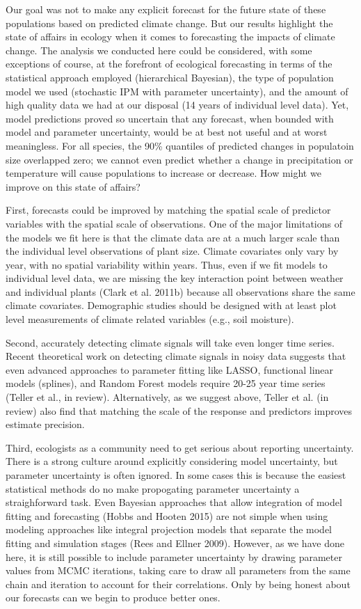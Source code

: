 \documentclass[12pt,]{article}
\begin{document}
Our goal was not to make any explicit forecast for the future state of
these populations based on predicted climate change. But our results
highlight the state of affairs in ecology when it comes to forecasting
the impacts of climate change. The analysis we conducted here could be
considered, with some exceptions of course, at the forefront of
ecological forecasting in terms of the statistical approach employed
(hierarchical Bayesian), the type of population model we used
(stochastic IPM with parameter uncertainty), and the amount of high
quality data we had at our disposal (14 years of individual level data).
Yet, model predictions proved so uncertain that any forecast, when
bounded with model and parameter uncertainty, would be at best not
useful and at worst meaningless. For all species, the 90\% quantiles of
predicted changes in populatoin size overlapped zero; we cannot even
predict whether a change in precipitation or temperature will cause
populations to increase or decrease. How might we improve on this state
of affairs?

First, forecasts could be improved by matching the spatial scale of
predictor variables with the spatial scale of observations. One of the
major limitations of the models we fit here is that the climate data are
at a much larger scale than the individual level observations of plant
size. Climate covariates only vary by year, with no spatial variability
within years. Thus, even if we fit models to individual level data, we
are missing the key interaction point between weather and individual
plants (Clark et al. 2011b) because all observations share the same
climate covariates. Demographic studies should be designed with at least
plot level measurements of climate related variables (e.g., soil
moisture).

Second, accurately detecting climate signals will take even longer time
series. Recent theoretical work on detecting climate signals in noisy
data suggests that even advanced approaches to parameter fitting like
LASSO, functional linear models (splines), and Random Forest models
require 20-25 year time series (Teller et al., in review).
Alternatively, as we suggest above, Teller et al. (in review) also find
that matching the scale of the response and predictors improves estimate
precision.

Third, ecologists as a community need to get serious about reporting
uncertainty. There is a strong culture around explicitly considering
model uncertainty, but parameter uncertainty is often ignored. In some
cases this is because the easiest statistical methods do no make
propogating parameter uncertainty a straighforward task. Even Bayesian
approaches that allow integration of model fitting and forecasting
(Hobbs and Hooten 2015) are not simple when using modeling approaches
like integral projection models that separate the model fitting and
simulation stages (Rees and Ellner 2009). However, as we have done here,
it is still possible to include parameter uncertainty by drawing
parameter values from MCMC iterations, taking care to draw all
parameters from the same chain and iteration to account for their
correlations. Only by being honest about our forecasts can we begin to
produce better ones.
\end{document}
